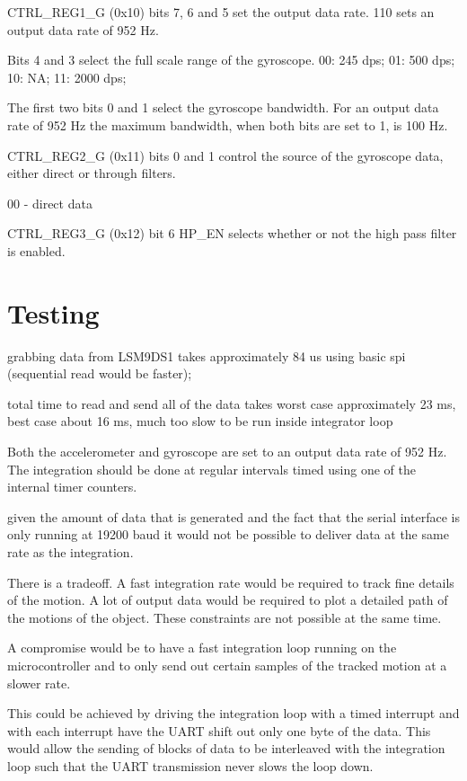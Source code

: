 \documentclass[10pt, a4paper]{article}
\begin{document}
CTRL\_REG1\_G (0x10) bits 7, 6 and 5 set the output data rate. 110 sets an output data rate of 952 Hz.

Bits 4 and 3 select the full scale range of the gyroscope. 00: 245 dps; 01: 500 dps; 10: NA; 11: 2000 dps;

The first two bits 0 and 1 select the gyroscope bandwidth. For an output data rate of 952 Hz the maximum bandwidth, when both bits are set to 1, is 100 Hz.

CTRL\_REG2\_G (0x11) bits 0 and 1 control the source of the gyroscope data, either direct or through filters.

00 - direct data

CTRL\_REG3\_G (0x12) bit 6 HP\_EN selects whether or not the high pass filter is enabled.

\section{Testing}

grabbing data from LSM9DS1 takes approximately 84 us using basic spi (sequential read would be faster);

total time to read and send all of the data takes worst case approximately 23 ms, best case about 16 ms, much too slow to be run inside integrator loop

Both the accelerometer and gyroscope are set to an output data rate of 952 Hz. The integration should be done at regular intervals timed using one of the internal timer counters.

given the amount of data that is generated and the fact that the serial interface is only running at 19200 baud it would not be possible to deliver data at the same rate as the integration.

There is a tradeoff. A fast integration rate would be required to track fine details of the motion. A lot of output data would be required to plot a detailed path of the motions of the object. These constraints are not possible at the same time.

A compromise would be to have a fast integration loop running on the microcontroller and to only send out certain samples of the tracked motion at a slower rate.

This could be achieved by driving the integration loop with a timed interrupt and with each interrupt have the UART shift out only one byte of the data. This would allow the sending of blocks of data to be interleaved with the integration loop such that the UART transmission never slows the loop down.
\end{document}
